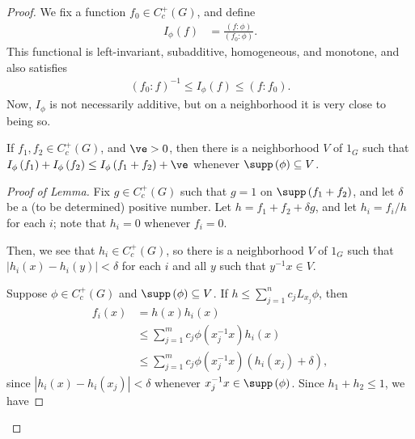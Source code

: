 \documentclass[10pt]{mypackage}
\begin{document}
\begin{proof}
  We fix a function $f_0\in C_c^{+}\left( G \right)$, and define
  \begin{align*}
    I_{\phi}\left( f \right) &= \frac{\left( f:\phi \right)}{\left( f_0:\phi \right)}.
  \end{align*}
  This functional is left-invariant, subadditive, homogeneous, and monotone, and also satisfies
  \begin{align*}
    \left( f_0:f \right)^{-1}\leq I_{\phi}\left( f \right)\leq \left( f:f_0 \right).
  \end{align*}
  Now, $I_{\phi}$ is not necessarily additive, but on a neighborhood it is very close to being so.
  \begin{lemma}
    If $f_1,f_2\in C_c^{+}\left( G \right)$, and $\ve > 0$, then there is a neighborhood $V$ of $1_G$ such that $I_{\phi}\left( f_1 \right) + I_{\phi}\left( f_2 \right) \leq I_{\phi}\left( f_1 + f_2 \right) + \ve$ whenever $\supp\left( \phi \right)\subseteq V$.
  \end{lemma}
  \begin{proof}[Proof of Lemma]
    Fix $g\in C_c^{+}\left( G \right)$ such that $g = 1$ on $\supp\left( f_1 + f_2 \right)$, and let $\delta$ be a (to be determined) positive number. Let $h = f_1 + f_2 + \delta g$, and let $h_i = f_i/h$ for each $i$; note that $h_i = 0$ whenever $f_i = 0$.\newline

    Then, we see that $h_i\in C_c^{+}\left( G \right)$, so there is a neighborhood $V$ of $1_G$ such that $\left\vert h_i\left( x \right) - h_i\left( y \right) \right\vert < \delta$ for each $i$ and all $y$ such that $y^{-1}x\in V$.\newline

    Suppose $\phi\in C_c^{+}\left( G \right)$ and $\supp\left( \phi \right) \subseteq V$. If $h\leq \sum_{j=1}^{n}c_jL_{x_j}\phi$, then
    \begin{align*}
      f_i(x) &= h(x)h_i(x)\\
             &\leq \sum_{j=1}^{m} c_j\phi\left( x_j^{-1}x \right)h_i(x)\\
             &\leq \sum_{j=1}^{m}c_j\phi\left( x_j^{-1}x \right)\left( h_i\left( x_j \right) + \delta \right),
    \end{align*}
    since $\left\vert h_i(x)-h_i\left( x_j \right) \right\vert < \delta$ whenever $x_j^{-1}x\in \supp\left( \phi \right)$. Since $h_1 + h_2 \leq 1$, we have
  \end{proof}
\end{proof}
\end{document}
